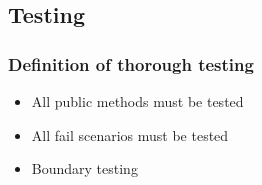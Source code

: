 \subsection{Testing}
\label{deftesting}
\subsubsection{Definition of thorough testing}
\begin{itemize}
  \item All public methods must be tested
  \item All fail scenarios must be tested
  \item Boundary testing
\end{itemize}
\newpage